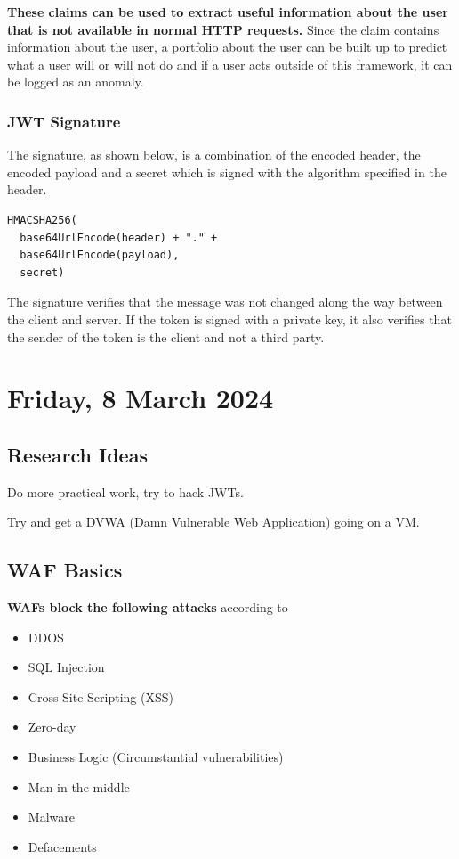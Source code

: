 \textbf{These claims can be used to extract useful information about the user that is not available in normal HTTP requests.} Since the claim contains information about the user, a portfolio about the user can be built up to predict what a user will or will not do and if a user acts outside of this framework, it can be logged as an anomaly.

\subsubsection{JWT Signature}
The signature, as shown below, is a combination of the encoded header, the encoded payload and a secret which is signed with the algorithm specified in the header.

\begin{lstlisting}
HMACSHA256(
  base64UrlEncode(header) + "." +
  base64UrlEncode(payload),
  secret)
\end{lstlisting}

The signature verifies that the message was not changed along the way between the client and server. If the token is signed with a private key, it also verifies that the sender of the token is the client and not a third party.

\pendsign

\section[2024/03/08]{Friday, 8 March 2024}

\subsection{Research Ideas}

\begin{compactitem}
    \item Do more practical work, try to hack JWTs.
    \item Try and get a DVWA (Damn Vulnerable Web Application) going on a VM.
\end{compactitem}


\subsection{WAF Basics}
\textbf{WAFs block the following attacks} according to \cite{WAFATTACKS}
\begin{itemize}
    \item DDOS
    \item SQL Injection
    \item Cross-Site Scripting (XSS)
    \item Zero-day
    \item Business Logic (Circumstantial vulnerabilities)
    \item Man-in-the-middle
    \item Malware
    \item Defacements
\end{itemize}

